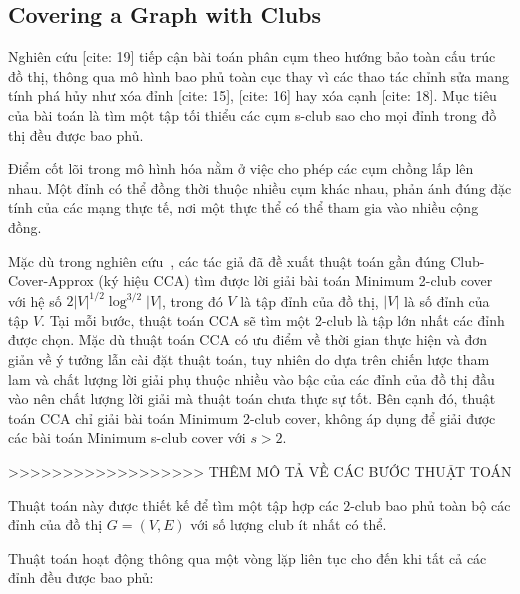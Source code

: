 \subsection{Covering a Graph with Clubs~\cite{dondi2019covering}}
Nghiên cứu [cite: 19] tiếp cận bài toán phân cụm theo hướng bảo toàn cấu trúc đồ thị, thông qua mô hình bao phủ toàn cục thay vì các thao tác chỉnh sửa mang tính phá hủy như xóa đỉnh [cite: 15], [cite: 16] hay xóa cạnh [cite: 18]. Mục tiêu của bài toán là tìm một tập tối thiểu các cụm s-club sao cho mọi đỉnh trong đồ thị đều được bao phủ.

Điểm cốt lõi trong mô hình hóa nằm ở việc cho phép các cụm chồng lấp lên nhau. Một đỉnh có thể đồng thời thuộc nhiều cụm khác nhau, phản ánh đúng đặc tính của các mạng thực tế, nơi một thực thể có thể tham gia vào nhiều cộng đồng.

Mặc dù trong nghiên cứu~\cite{dondi2019covering}, các tác giả đã đề xuất thuật toán gần đúng Club-Cover-Approx (ký hiệu CCA) tìm được lời giải bài toán Minimum 2-club cover với hệ số $2|V|^{1/2}\log^{3/2}|V|$, trong đó $V$ là tập đỉnh của đồ thị, $|V|$ là số đỉnh của tập $V$. Tại mỗi bước, thuật toán CCA sẽ tìm một 2-club là tập lớn nhất các đỉnh được chọn. Mặc dù thuật toán CCA có ưu điểm về thời gian thực hiện và đơn giản về ý tưởng lẫn cài đặt thuật toán, tuy nhiên do dựa trên chiến lược tham lam và chất lượng lời giải phụ thuộc nhiều vào bậc của các đỉnh của đồ thị đầu vào nên chất lượng lời giải mà thuật toán chưa thực sự tốt. Bên cạnh đó, thuật toán CCA chỉ giải bài toán Minimum 2-club cover, không áp dụng để giải được các bài toán Minimum s-club cover với $s > 2$.

>>>>>>>>>>>>>>>>>> THÊM MÔ TẢ VỀ CÁC BƯỚC THUẬT TOÁN


Thuật toán này được thiết kế để tìm một tập hợp các $2$-club bao phủ toàn bộ các đỉnh của đồ thị $G = (V, E)$ với số lượng club ít nhất có thể.


Thuật toán hoạt động thông qua một vòng lặp liên tục cho đến khi tất cả các đỉnh đều được bao phủ:

